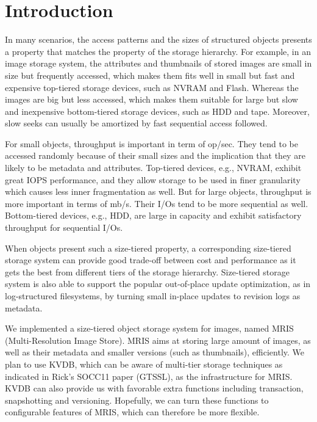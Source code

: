 \section{Introduction}
\label{intro}

In many scenarios, the access patterns and the sizes of structured
objects presents a property that matches the property of the storage
hierarchy. For example, in an image storage system, the attributes and
thumbnails of stored images are small in size but frequently accessed,
which makes them fits well in small but fast and expensive top-tiered
storage devices, such as NVRAM and Flash.  Whereas the images are big
but less accessed, which makes them suitable for large but slow and
inexpensive bottom-tiered storage devices, such as HDD and tape.
Moreover, slow seeks can usually be amortized by fast sequential
access followed.

For small objects, throughput is important in term of op/sec. They
tend to be accessed randomly because of their small sizes and the
implication that they are likely to be metadata and attributes.
Top-tiered devices, e.g., NVRAM, exhibit great IOPS performance, and
they allow storage to be used in finer granularity which causes less
inner fragmentation as well. But for large objects, throughput is more
important in terms of mb/s. Their I/Os tend to be more sequential as
well. Bottom-tiered devices, e.g., HDD, are large in capacity and
exhibit satisfactory throughput for sequential I/Os. 

When objects present such a size-tiered property, a corresponding
size-tiered storage system can provide good trade-off between cost and
performance as it gets the best from different tiers of the storage
hierarchy. Size-tiered storage system is also able to support the
popular out-of-place update optimization, as in log-structured
filesystems, by turning small in-place updates to revision logs as
metadata.

We implemented a size-tiered object storage system for images, named
MRIS (Multi-Resolution Image Store). MRIS aims at storing large amount
of images, as well as their metadata and smaller versions (such as
thumbnails), efficiently. We plan to use KVDB, which can be aware of
multi-tier storage techniques as indicated in Rick's SOCC11 paper
(GTSSL), as the infrastructure for MRIS. KVDB can also provide us with
favorable extra functions including transaction, snapshotting and
versioning.  Hopefully, we can turn these functions to configurable
features of MRIS, which can therefore be more flexible.

